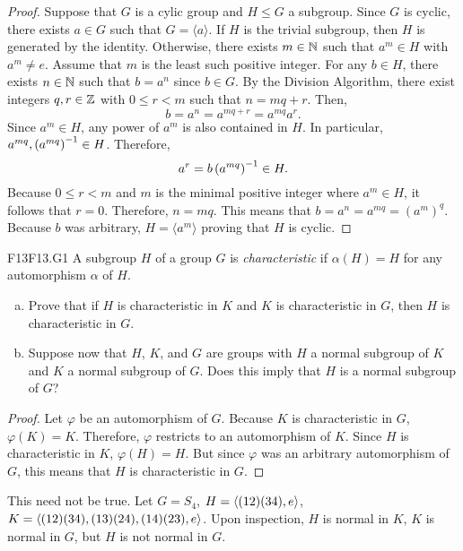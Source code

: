 \documentclass[../AlgebraQualSolutions.tex]{subfiles}
\begin{document}
	\begin{proof}
		Suppose that $G$ is a cylic group and $H \leq G$ a subgroup. Since $G$ is cyclic, there exists $a \in G$ such that $G = \langle a \rangle$. If $H$ is the trivial subgroup, then $H$ is generated by the identity. Otherwise, there exists $m \in \mathbb{N}$ such that $a^m \in H$ with $a^m \neq e$. Assume that $m$ is the least such positive integer. For any $b \in H$, there exists $n \in \mathbb{N}$ such that $b = a^n$ since $b \in G$. By the Division Algorithm, there exist integers $q,r \in \mathbb{Z}$ with $0 \leq r < m$ such that $n = mq + r$. Then,
			\[b = a^n = a^{mq+r} = a^{mq}a^r.\]
		Since $a^m \in H$, any power of $a^m$ is also contained in $H$. In particular, $a^{mq}, \left(a^{mq}\right)^{-1} \in H$. Therefore,
			\[a^r = b \left(a^{mq}\right)^{-1} \in H.\]
		Because $0 \leq r < m$ and $m$ is the minimal positive integer where $a^m \in H$, it follows that $r = 0$. Therefore, $n = mq$. This means that $b = a^n=a^{mq} = (a^m)^q$. Because $b$ was arbitrary, $H = \langle a^m \rangle$ proving that $H$ is cyclic.
	\end{proof}

	\begin{prob}{F13}{F13.G1}
		A subgroup $H$ of a group $G$ is \emph{characteristic} if $\alpha(H) = H$ for any automorphism $\alpha$ of $H$.
		
		\begin{enumerate}[(a)]
			\item Prove that if $H$ is characteristic in $K$ and $K$ is characteristic in $G$, then $H$ is characteristic in $G$.
			\item Suppose now that $H$, $K$, and $G$ are groups with $H$ a normal subgroup of $K$ and $K$ a normal subgroup of $G$. Does this imply that $H$ is a normal subgroup of $G$?
		\end{enumerate}
	\end{prob}
	
	\begin{proof}
		Let $\varphi$ be an automorphism of $G$. Because $K$ is characteristic in $G$, $\varphi(K) = K$. Therefore, $\varphi$ restricts to an automorphism of $K$. Since $H$ is characteristic in $K$, $\varphi(H) = H$. But since $\varphi$ was an arbitrary automorphism of $G$, this means that $H$ is characteristic in $G$.
	\end{proof}
	
	\begin{solution}
	This need not be true. Let $G = S_4$, $H = \left\langle (12)(34),e \right\rangle$, $K = \left\langle (12)(34), (13)(24),(14)(23), e \right\rangle$. Upon inspection, $H$ is normal in $K$, $K$ is normal in $G$, but $H$ is not normal in $G$.
	\end{solution}
\end{document}
